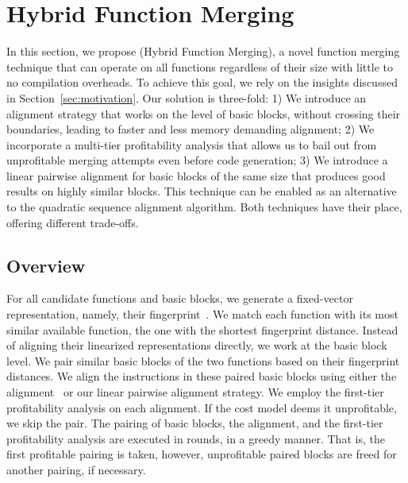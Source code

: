
\section{Hybrid Function Merging} \label{sec:contribution}

In this section, we propose {\ProjName} (Hybrid Function Merging), a novel function merging technique that can operate on all functions regardless of their size with little to no compilation overheads.
To achieve this goal, we rely on the insights discussed in Section~\ref{sec:motivation}.
Our solution is three-fold:
1) We introduce an alignment strategy that works on the level of basic blocks, without crossing their boundaries, leading to faster and less memory demanding alignment;
2) We incorporate a multi-tier profitability analysis that allows us to bail out from unprofitable merging attempts even before code generation;
3) We introduce a linear pairwise alignment for basic blocks of the same size that produces good results on highly similar blocks.
This technique can be enabled as an alternative to the quadratic sequence alignment algorithm.
Both techniques have their place, offering different trade-offs.

\subsection{Overview}

For all candidate functions and basic blocks, we generate a fixed-vector representation, namely, their fingerprint~\cite{rocha19,rocha20}.
We match each function with its most similar available function, the one with the shortest fingerprint distance.
Instead of aligning their linearized representations directly, we work at the basic block level.
We pair similar basic blocks of the two functions based on their fingerprint distances.
We align the instructions in these paired basic blocks using either the {\NW} alignment~\cite{needleman70} or our linear pairwise alignment strategy.
We employ the first-tier profitability analysis on each alignment. If the cost model deems it unprofitable, we skip the pair.
The pairing of basic blocks, the alignment, and the first-tier profitability analysis are executed in rounds, in a greedy manner.
That is, the first profitable pairing is taken, however, unprofitable paired blocks are freed for another pairing, if necessary.

